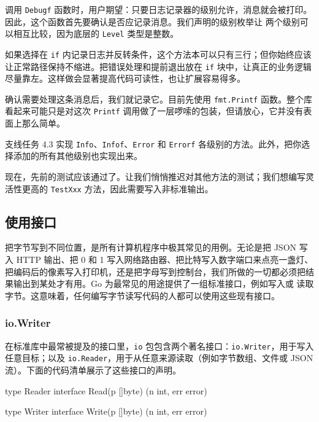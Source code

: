 调用 \texttt{Debugf} 函数时，用户期望：只要日志记录器的级别允许，消息就会被打印。因此，这个函数首先要确认是否应记录消息。我们声明的级别枚举让
两个级别可以相互比较，因为底层的 \texttt{Level} 类型是整数。

如果选择在 \texttt{if} 内记录日志并反转条件，这个方法本可以只有三行；但你始终应该让正常路径保持不缩进。把错误处理和提前退出放在 \texttt{if} 块中，让真正的业务逻辑尽量靠左。这样做会显著提高代码可读性，也让扩展容易得多。

确认需要处理这条消息后，我们就记录它。目前先使用 \texttt{fmt.Printf} 函数。整个库看起来可能只是对这次 \texttt{Printf} 调用做了一层啰嗦的包装，但请放心，它并没有表面上那么简单。

\begin{infobox}{支线任务 4.3}
实现 \texttt{Info}、\texttt{Infof}、\texttt{Error} 和 \texttt{Errorf} 各级别的方法。此外，把你选择添加的所有其他级别也实现出来。
\end{infobox}

现在，先前的测试应该通过了。让我们悄悄推迟对其他方法的测试；我们想编写灵活性更高的 \texttt{TestXxx} 方法，因此需要写入非标准输出。

\subsection{使用接口}

把字节写到不同位置，是所有计算机程序中极其常见的用例。无论是把 JSON 写入 HTTP 输出、把 0 和 1 写入网络路由器、把比特写入数字端口来点亮一盏灯、把编码后的像素写入打印机，还是把字母写到控制台，我们所做的一切都必须把结果输出到某处才有用。Go 为最常见的用途提供了一组标准接口，例如写入或
读取字节。这意味着，任何编写字节读写代码的人都可以使用这些现有接口。

\subsubsection*{io.Writer}

在标准库中最常被提及的接口里，\texttt{io} 包包含两个著名接口：\texttt{io.Writer}，用于写入任意目标；以及 \texttt{io.Reader}，用于从任意来源读取（例如字节数组、文件或 JSON 流）。下面的代码清单展示了这些接口的声明。

\begin{gocode}[title={代码清单 4.7 io 接口}]
type Reader interface {
    Read(p []byte) (n int, err error)
}

type Writer interface {
    Write(p []byte) (n int, err error)
}
\end{gocode}

